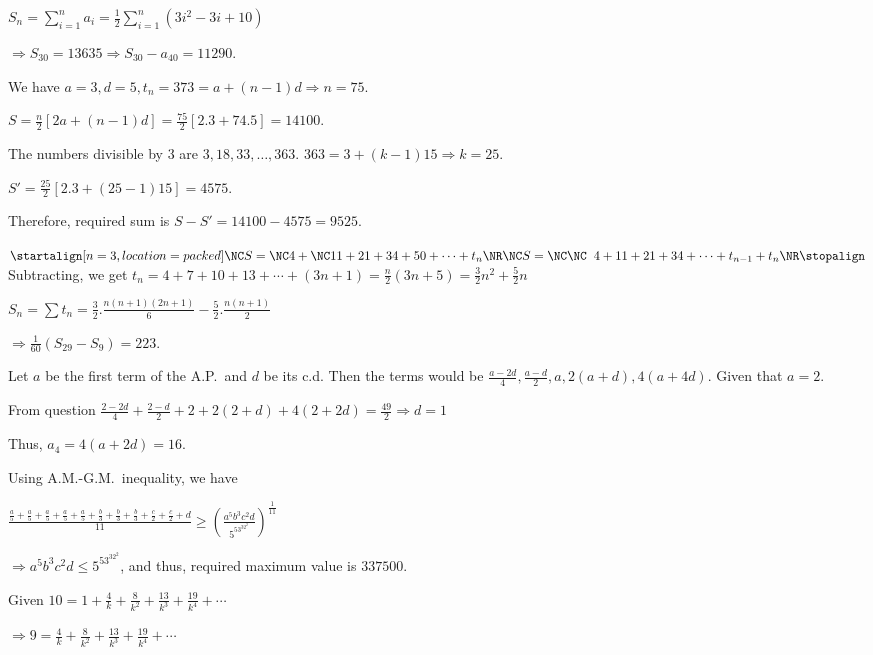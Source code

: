   $S_n = \displaystyle\sum_{i = 1}^na_i = \frac{1}{2}\sum_{i = 1}^n(3i^2 - 3i + 10)$

  $\Rightarrow S_{30} = 13635 \Rightarrow S_{30} - a_{40} = 11290$.
\item We have $a = 3, d = 5, t_n = 373 = a + (n - 1)d \Rightarrow n = 75$.

  $S = \frac{n}{2}[2a + (n - 1)d] = \frac{75}{2}[2.3 + 74.5] = 14100$.

  The numbers divisible by $3$ are $3, 18, 33, \ldots, 363$. $363 = 3 + (k - 1)15\Rightarrow k = 25$.

  $S' = \frac{25}{2}[2.3 + (25 - 1)15] = 4575$.

  Therefore, required sum is $S - S' = 14100 - 4575 = 9525$.
\item \startframed[align=normal,frame=off,location=high]
  $\startalign[n=3, location=packed]
  \NC S = \NC 4 + \NC 11 + 21 + 34 + 50 + \cdots + t_n\NR
  \NC S = \NC \NC \;\;4 + 11 + 21 + 34 + \cdots + t_{n - 1} + t_n\NR\stopalign$\stopframed
  \\

  Subtracting, we get $t_n = 4 + 7 + 10 + 13 + \cdots + (3n + 1) = \frac{n}{2}(3n + 5) = \frac{3}{2}n^2
  + \frac{5}{2}n$

  $S_n = \sum t_n = \frac{3}{2}.\frac{n(n + 1)(2n + 1)}{6} - \frac{5}{2}.\frac{n(n + 1)}{2}$

  $\Rightarrow \frac{1}{60}(S_{29} - S_9) = 223$.
\item Let $a$ be the first term  of the A.P.\ and $d$ be its c.d. Then the terms would be $\frac{a - 2d}{4},
  \frac{a - d}{2}, a, 2(a + d), 4(a + 4d)$. Given that $a = 2$.

  From question $\frac{2 - 2d}{4} + \frac{2 - d}{2} + 2 + 2(2 + d) + 4(2 + 2d) = \frac{49}{2}\Rightarrow d =
  1$

  Thus, $a_4 = 4(a + 2d) = 16$.
\item Using A.M.-G.M.\ inequality, we have

  $\frac{\frac{a}{5} + \frac{a}{5} + \frac{a}{5} + \frac{a}{5} + \frac{a}{5} + \frac{b}{3} + \frac{b}{3}
  + \frac{b}{3} + \frac{c}{2} + \frac{c}{2} +
  d}{11}\geq \left(\frac{a^5b^3c^2d}{5^53^32^2}\right)^{\frac{1}{11}}$

  $\Rightarrow a^5b^3c^2d\leq 5^53^32^2$, and thus, required maximum value is $337500$.
\item Given $10 = 1 + \frac{4}{k} + \frac{8}{k^2} + \frac{13}{k^3} + \frac{19}{k^4} + \cdots$

  $\Rightarrow 9 = \frac{4}{k} + \frac{8}{k^2} + \frac{13}{k^3} + \frac{19}{k^4} + \cdots$

